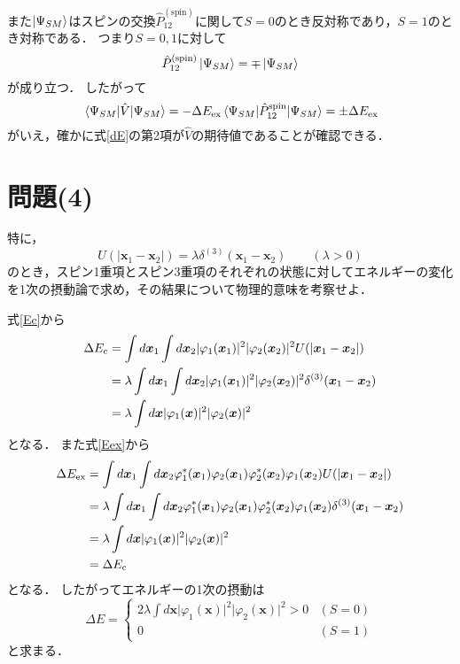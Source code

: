 \documentclass[a4paper,11pt]{jsarticle}
\begin{document}
また$\ket{\Psi_{SM}}$はスピンの交換$\hat{P}^{(\mathrm{spin})}_{12}$に関して$S=0$のとき反対称であり，$S=1$のとき対称である．
つまり$S=0,1$に対して
\begin{equation}
  \hat{P}^{(\mathrm{spin})}_{12} \ket{\Psi_{SM}} = \mp \ket{\Psi_{SM}}
\end{equation}
が成り立つ．
したがって
\begin{equation}
  \expval{\hat{V}}{\Psi_{SM}} = - \Delta E_{\mathrm{ex}} \expval{\hat{P}^{\mathrm{spin}}_{12}}{\Psi_{SM}} = \pm \Delta E_{\mathrm{ex}}
\end{equation}
がいえ，確かに式\eqref{dE}の第2項が$\hat{V}$の期待値であることが確認できる．

\section{問題(4)}
\begin{tcolorbox}[title=問題(4)]
  特に，
  \begin{equation}
    U(\left| \bm{x}_1 - \bm{x}_2\right|) = \lambda \delta^{(3)}(\bm{x}_1 - \bm{x}_2) \qquad (\lambda > 0)
  \end{equation}
  のとき，スピン1重項とスピン3重項のそれぞれの状態に対してエネルギーの変化を1次の摂動論で求め，その結果について物理的意味を考察せよ．  
\end{tcolorbox}

式\eqref{Ec}から
\begin{align}
  \Delta E_{\mathrm{c}} 
  &= \int d\bm{x}_1 \int d\bm{x}_2 \lvert \varphi_1(\bm{x}_1) \rvert^2 \lvert \varphi_2(\bm{x}_2) \rvert^2 U(\lvert\bm{x}_1 - \bm{x}_2\rvert) \notag\\
  &= \lambda \int d\bm{x}_1 \int d\bm{x}_2 \lvert \varphi_1(\bm{x}_1) \rvert^2 \lvert \varphi_2(\bm{x}_2) \rvert^2 \delta^{(3)}(\bm{x}_1 - \bm{x}_2) \notag\\
  &= \lambda \int d\bm{x} \lvert \varphi_1(\bm{x}) \rvert^2 \lvert \varphi_2(\bm{x}) \rvert^2 
\end{align}
となる．
また式\eqref{Eex}から
\begin{align}
  \Delta E_{\mathrm{ex}} 
  &= \int d\bm{x}_1 \int d\bm{x}_2 \varphi^*_1(\bm{x}_1)\varphi_2(\bm{x}_1)\varphi^*_2(\bm{x}_2)\varphi_1(\bm{x}_2) U(\lvert\bm{x}_1 - \bm{x}_2\rvert) \notag\\
  &= \lambda \int d\bm{x}_1 \int d\bm{x}_2 \varphi^*_1(\bm{x}_1)\varphi_2(\bm{x}_1)\varphi^*_2(\bm{x}_2)\varphi_1(\bm{x}_2) \delta^{(3)}(\bm{x}_1 - \bm{x}_2) \notag \\
  &= \lambda \int d\bm{x} \lvert \varphi_1(\bm{x}) \rvert^2 \lvert \varphi_2(\bm{x}) \rvert^2 \notag\\
  &= \Delta E_{\mathrm{c}} 
\end{align}
となる．
したがってエネルギーの1次の摂動は
\begin{equation}
  \Delta E = \left\{
  \begin{array}{ll}
    2 \lambda \int d\bm{x} \lvert \varphi_1(\bm{x}) \rvert^2 \lvert \varphi_2(\bm{x}) \rvert^2 > 0 & (S=0) \\
    0 & (S=1)
  \end{array}
  \right.
\end{equation}
と求まる．
\end{document}
